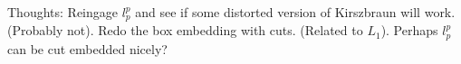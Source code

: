 
Thoughts:
Reingage $l_p^p$ and see if some distorted version of Kirszbraun will work.
(Probably not). 
Redo the box embedding with cuts. (Related to $L_1$). Perhaps $l_p^p$ can be cut embedded nicely?


